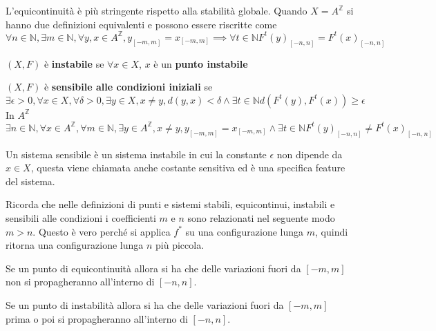 \begin{nota}
    L'equicontinuità è più stringente rispetto alla stabilità globale. Quando $X=A^\mathbb{Z}$
    si hanno due definizioni equivalenti e possono essere riscritte come
    $$\forall n\in \mathbb{N} ,\exists m\in \mathbb{N} , \forall y,x\in A^\mathbb{Z}, y_{[-m,m]} = x_{[-m,m]} \implies \forall t\in \mathbb{N} F^t(y)_{[-n,n]}=F^t(x)_{[-n,n]}$$
\end{nota}

\begin{definizione} 
    $(X,F)$ è \textbf{instabile} se $\forall x \in X$, $x$ è un \textbf{punto instabile}
\end{definizione}

\begin{definizione} 
    $(X,F)$ è \textbf{sensibile alle condizioni iniziali} se
    $$\exists \epsilon > 0,\forall x \in X, \forall \delta > 0, \exists y\in X,x \ne y, d(y,x) < \delta \land \exists t\in \mathbb{N} d(F^t(y),F^t(x))\ge \epsilon$$
    In $A^\mathbb{Z}$
    $$\exists n\in \mathbb{N} ,\forall x \in A^\mathbb{Z}, \forall m\in \mathbb{N} , \exists y\in A^\mathbb{Z},x \ne y, y_{[-m,m]} = x_{[-m,m]} \land \exists t\in \mathbb{N} F^t(y)_{[-n,n]}\ne F^t(x)_{[-n,n]}$$
\end{definizione}

\begin{nota}
    Un sistema sensibile è un sistema instabile in cui la constante $\epsilon$
    non dipende da $x\in X$, questa viene chiamata anche costante sensitiva ed
    è una specifica feature del sistema.
\end{nota}

\begin{nota}
    Ricorda che nelle definizioni di punti e sistemi stabili, equicontinui, instabili e sensibili
    alle condizioni i coefficienti $m$ e $n$ sono relazionati nel seguente modo $m> n$.
    Questo è vero perché si applica $f^\ast$ su una configurazione lunga $m$, quindi
    ritorna una configurazione lunga $n$ più piccola.
\end{nota}

Se un punto di equicontinuità allora si ha che delle variazioni fuori da $[-m,m]$
non si propagheranno all'interno di $[-n,n]$.

Se un punto di instabilità allora si ha che delle variazioni fuori da $[-m,m]$
prima o poi si propagheranno all'interno di $[-n,n]$.

